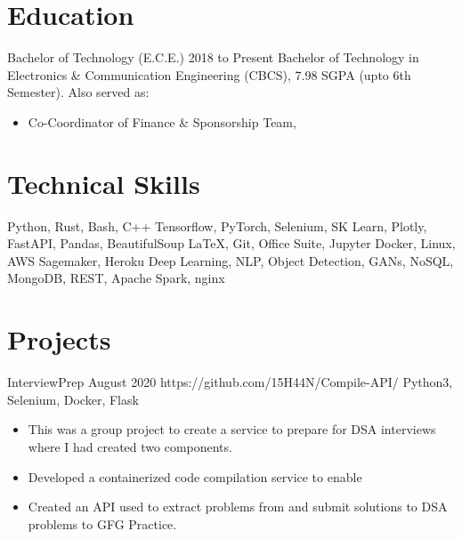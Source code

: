 \section{Education}

\Education
{Bachelor of Technology (E.C.E.)}
{2018 to Present}
{\university}
Bachelor of Technology in Electronics \& Communication Engineering (CBCS), 7.98 SGPA (upto 6th Semester). Also served as:
\begin{itemize}
    \item Co-Coordinator of Finance \& Sponsorship Team, 
\end{itemize}

% 
\section{Technical Skills} 
\begin{ListSkills}

     Python, Rust, Bash, C++
     Tensorflow, PyTorch, Selenium, SK Learn, Plotly, FastAPI, Pandas, BeautifulSoup
     \LaTeX, Git, Office Suite, Jupyter
     Docker, Linux, AWS Sagemaker, Heroku
     Deep Learning, NLP, Object Detection, GANs,  
     NoSQL, MongoDB, REST, Apache Spark, nginx
\end{ListSkills}

\section{Projects}

\ProjectHead
{InterviewPrep}
{August 2020}
{https://github.com/15H44N/Compile-API/}
{Python3, Selenium, Docker, Flask}

\begin{itemize}
    \item This was a group project to create a service to prepare for DSA interviews where I had created two components.
    \item Developed a containerized code compilation service to enable 
    \item Created an API used to extract problems from and submit solutions to DSA problems to GFG Practice.
\end{itemize}
\smallskip


